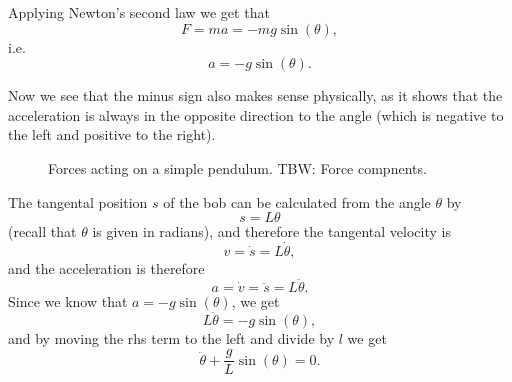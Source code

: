 Applying Newton's second law we get that
\begin{equation}
	F = ma = -mg\sin(\theta),
	\label{eq:simple_pendulum_newton_second_law}
\end{equation}
i.e.
\begin{equation}
	a = -g\sin(\theta).
	\label{eq:simple_pendulum_acceleration}
\end{equation}

Now we see that the minus sign also makes sense physically, as it shows that the acceleration is always in the opposite direction to the angle (which is negative to the left and positive to the right).

\begin{figure}
	\begin{center}
	\end{center}
	\caption{Forces acting on a simple pendulum. TBW: Force compnents.}
	\label{fig:simple_pendulum_forces}
\end{figure}

The tangental position $s$ of the bob can be calculated from the angle $\theta$ by
\begin{equation}
	s = L\theta
	\label{eq:simple_pendulum_tangental_position}
\end{equation}
(recall that $\theta$ is given in radians), and therefore the tangental velocity is
\begin{equation}
	v = \dot{s} = L\dot{\theta},
	\label{eq:simple_pendulum_tangental_velovity}
\end{equation}
and the acceleration is therefore
\begin{equation}
	a = \dot{v} = \ddot{s} = L\ddot{\theta}.
	\label{eq:simple_pendulum_tangental_acceleration}
\end{equation}
Since we know that $a=-g\sin(\theta)$, we get
\begin{equation}
	L\ddot{\theta} = -g\sin(\theta),
\end{equation}
and by moving the rhs term to the left and divide by $l$ we get
\begin{equation}
	\ddot{\theta} + \frac{g}{L}\sin(\theta) = 0.
	\label{eq:simple_pendulum_differential_equation}
\end{equation}

